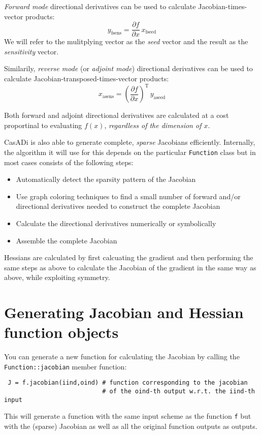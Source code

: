 \documentclass[a4paper,12pt]{book}
\begin{document}
\emph{Forward mode} directional derivatives can be used to calculate Jacobian-times-vector products:
\begin{equation}
 y_{\text{fsens}} = \frac{\partial f}{\partial x} \, x_{\text{fseed}}
\end{equation}
We will refer to the mulitplying vector as the \emph{seed} vector and the result as the \emph{sensitivity} vector.

Similarily, \emph{reverse mode} (or \emph{adjoint mode}) directional derivatives can be used to calculate Jacobian-transposed-times-vector products:
\begin{equation}
 x_{\text{asens}} = \left(\frac{\partial f}{\partial x}\right)^{\text{T}} \, y_{\text{aseed}}
\end{equation}

Both forward and adjoint directional derivatives are calculated at a cost proportinal to evaluating $f(x)$, \emph{regardless of the dimension of $x$}.

CasADi is also able to generate complete, \emph{sparse} Jacobians efficiently. Internally, the algorithm it will use for this depends on the particular \texttt{Function} class but in most cases consists of the following steps:
\begin{itemize}
 \item Automatically detect the sparsity pattern of the Jacobian
 \item Use graph coloring techniques to find a small number of forward and/or directional derivatives needed to construct the complete Jacobian
 \item Calculate the directional derivatives numerically or symbolically
 \item Assemble the complete Jacobian
\end{itemize}

Hessians are calculated by first calcuating the gradient and then performing the same steps as above to calculate the Jacobian of the gradient in the same way as above, while exploiting symmetry.

\section{Generating Jacobian and Hessian function objects}
You can generate a new function for calculating the Jacobian by calling the \texttt{Function::jacobian} member function:
\begin{verbatim}
 J = f.jacobian(iind,oind) # function corresponding to the jacobian
                           # of the oind-th output w.r.t. the iind-th input
\end{verbatim}
This will generate a function with the same input scheme as the function \texttt{f} but with the (sparse) Jacobian as well as all the original function outputs as outputs.
\end{document}
